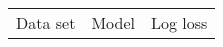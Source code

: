 \documentclass{article}\usepackage[]{graphicx}\usepackage[]{color}
\begin{document}
                                                                                                                                                                                                                                                                                                                                                                                                                                                                                                                                                                                                \begin{table}[ht]
                                                                                                                                                                                                                                                                                                                                                                                                                                                                                                                                                                                                \centering
                                                                                                                                                                                                                                                                                                                                                                                                                                                                                                                                                                                                \begin{tabular}{@{}|l|c|c|@{}}
                                                                                                                                                                                                                                                                                                                                                                                                                                                                                                                                                                                                \hline
                                                                                                                                                                                                                                                                                                                                                                                                                                                                                                                                                                                                Data set & Model & Log loss\\ 

\end{tabular}
\end{table}
\end{document}
